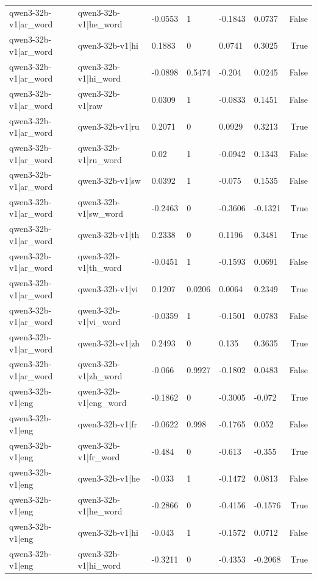 \begin{table}
\begin{tabular}{llllllr}
qwen3-32b-v1|ar_word & qwen3-32b-v1|he_word & -0.0553 & 1 & -0.1843 & 0.0737 & False \\
qwen3-32b-v1|ar_word & qwen3-32b-v1|hi & 0.1883 & 0 & 0.0741 & 0.3025 & True \\
qwen3-32b-v1|ar_word & qwen3-32b-v1|hi_word & -0.0898 & 0.5474 & -0.204 & 0.0245 & False \\
qwen3-32b-v1|ar_word & qwen3-32b-v1|raw & 0.0309 & 1 & -0.0833 & 0.1451 & False \\
qwen3-32b-v1|ar_word & qwen3-32b-v1|ru & 0.2071 & 0 & 0.0929 & 0.3213 & True \\
qwen3-32b-v1|ar_word & qwen3-32b-v1|ru_word & 0.02 & 1 & -0.0942 & 0.1343 & False \\
qwen3-32b-v1|ar_word & qwen3-32b-v1|sw & 0.0392 & 1 & -0.075 & 0.1535 & False \\
qwen3-32b-v1|ar_word & qwen3-32b-v1|sw_word & -0.2463 & 0 & -0.3606 & -0.1321 & True \\
qwen3-32b-v1|ar_word & qwen3-32b-v1|th & 0.2338 & 0 & 0.1196 & 0.3481 & True \\
qwen3-32b-v1|ar_word & qwen3-32b-v1|th_word & -0.0451 & 1 & -0.1593 & 0.0691 & False \\
qwen3-32b-v1|ar_word & qwen3-32b-v1|vi & 0.1207 & 0.0206 & 0.0064 & 0.2349 & True \\
qwen3-32b-v1|ar_word & qwen3-32b-v1|vi_word & -0.0359 & 1 & -0.1501 & 0.0783 & False \\
qwen3-32b-v1|ar_word & qwen3-32b-v1|zh & 0.2493 & 0 & 0.135 & 0.3635 & True \\
qwen3-32b-v1|ar_word & qwen3-32b-v1|zh_word & -0.066 & 0.9927 & -0.1802 & 0.0483 & False \\
qwen3-32b-v1|eng & qwen3-32b-v1|eng_word & -0.1862 & 0 & -0.3005 & -0.072 & True \\
qwen3-32b-v1|eng & qwen3-32b-v1|fr & -0.0622 & 0.998 & -0.1765 & 0.052 & False \\
qwen3-32b-v1|eng & qwen3-32b-v1|fr_word & -0.484 & 0 & -0.613 & -0.355 & True \\
qwen3-32b-v1|eng & qwen3-32b-v1|he & -0.033 & 1 & -0.1472 & 0.0813 & False \\
qwen3-32b-v1|eng & qwen3-32b-v1|he_word & -0.2866 & 0 & -0.4156 & -0.1576 & True \\
qwen3-32b-v1|eng & qwen3-32b-v1|hi & -0.043 & 1 & -0.1572 & 0.0712 & False \\
qwen3-32b-v1|eng & qwen3-32b-v1|hi_word & -0.3211 & 0 & -0.4353 & -0.2068 & True \\

\end{tabular}
\end{table}
